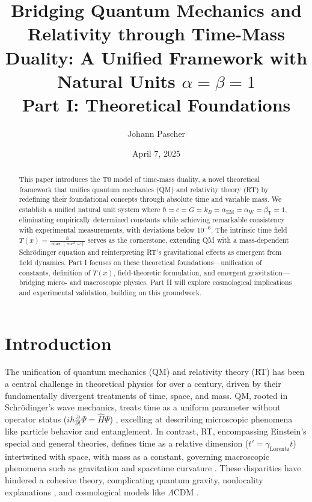 \documentclass[twocolumn,aps,prl]{revtex4-2}
\newcommand{\Tfield}{T(x)}
\newcommand{\alphaEM}{\alpha_{\text{EM}}}
\newcommand{\alphaW}{\alpha_{\text{W}}}
\newcommand{\betaT}{\beta_{\text{T}}}
\newcommand{\gammaf}{\gamma_{\text{Lorentz}}}
\newcommand{\LCDM}{\Lambda\text{CDM}}
\begin{document}
	
	\title{Bridging Quantum Mechanics and Relativity through Time-Mass Duality: A Unified Framework with Natural Units \(\alpha = \beta = 1\) \\ Part I: Theoretical Foundations}
	\author{Johann Pascher}
	\date{April 7, 2025}
	
	\begin{abstract}
		This paper introduces the T0 model of time-mass duality, a novel theoretical framework that unifies quantum mechanics (QM) and relativity theory (RT) by redefining their foundational concepts through absolute time and variable mass. We establish a unified natural unit system where \(\hbar = c = G = k_B = \alphaEM = \alphaW = \betaT = 1\), eliminating empirically determined constants while achieving remarkable consistency with experimental measurements, with deviations below \(10^{-6}\). The intrinsic time field \(\Tfield = \frac{\hbar}{\max(mc^2, \omega)}\) serves as the cornerstone, extending QM with a mass-dependent Schrödinger equation and reinterpreting RT’s gravitational effects as emergent from field dynamics. Part I focuses on these theoretical foundations—unification of constants, definition of \(\Tfield\), field-theoretic formulation, and emergent gravitation—bridging micro- and macroscopic physics. Part II will explore cosmological implications and experimental validation, building on this groundwork.
	\end{abstract}
	
	\maketitle
	
	\section{Introduction}
	\label{sec:introduction}
	
	The unification of quantum mechanics (QM) and relativity theory (RT) has been a central challenge in theoretical physics for over a century, driven by their fundamentally divergent treatments of time, space, and mass. QM, rooted in Schrödinger’s wave mechanics, treats time as a uniform parameter without operator status (\(i\hbar \frac{\partial}{\partial t}\Psi = \hat{H}\Psi\)) \cite{schrodinger1926}, excelling at describing microscopic phenomena like particle behavior and entanglement. In contrast, RT, encompassing Einstein’s special and general theories, defines time as a relative dimension (\(t' = \gammaf t\)) intertwined with space, with mass as a constant, governing macroscopic phenomena such as gravitation and spacetime curvature \cite{einstein1905,einstein1915}. These disparities have hindered a cohesive theory, complicating quantum gravity, nonlocality explanations \cite{bell1964}, and cosmological models like \(\LCDM\) \cite{Planck2020}.
	
\end{document}
